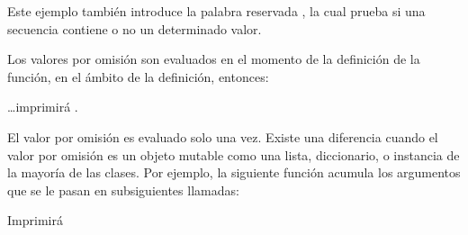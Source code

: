 \documentclass[a5paper,10pt,spanish]{sphinxmanual}
\begin{document}
\sphinxAtStartPar
Este ejemplo también introduce la palabra reservada , la cual prueba si una secuencia contiene o no un determinado valor.

\sphinxAtStartPar
Los valores por omisión son evaluados en el momento de la definición de la función, en el ámbito de la definición, entonces:

\begin{sphinxVerbatim}[commandchars=\\\{\}]
  

 

  
\end{sphinxVerbatim}

\sphinxAtStartPar
…imprimirá .

\sphinxAtStartPar
{} El valor por omisión es evaluado solo una vez. Existe una diferencia cuando el valor por omisión es un objeto mutable como una lista, diccionario, o instancia de la mayoría de las clases. Por ejemplo, la siguiente función acumula los argumentos que se le pasan en subsiguientes llamadas:

\begin{sphinxVerbatim}[commandchars=\\\{\}]
  \PYG{p}{[}\PYG{p}{]}
     

\end{sphinxVerbatim}

\sphinxAtStartPar
Imprimirá

\begin{sphinxVerbatim}[commandchars=\\\{\}]
\PYG{p}{[}\PYG{p}{]}
\PYG{p}{[} \PYG{p}{]}
\PYG{p}{[}  \PYG{p}{]}
\end{sphinxVerbatim}
\end{document}
